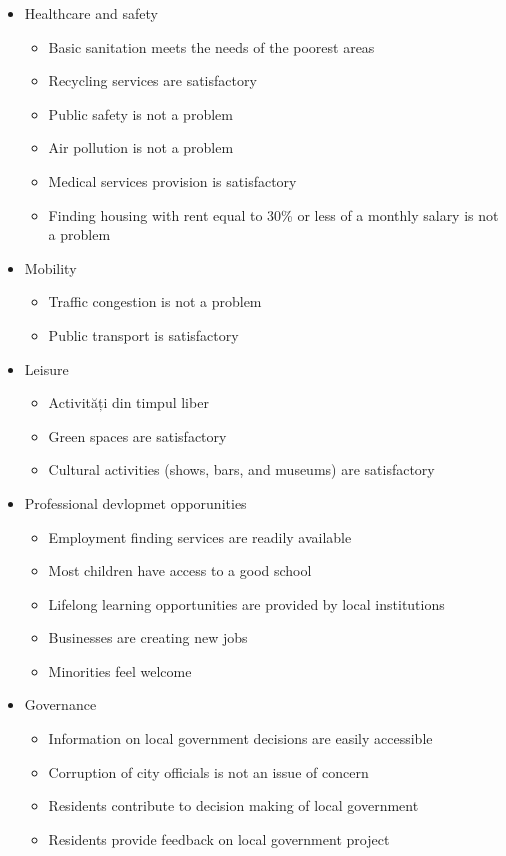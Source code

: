 \documentclass[
  english,
  12pt,
  a4paper,
]{scrartcl}
\providecommand{\tightlist}{%
  \setlength{\itemsep}{0pt}\setlength{\parskip}{0pt}}
\begin{document}
\begin{itemize}
\tightlist
\item
  Healthcare and safety

  \begin{itemize}
  \tightlist
  \item
    Basic sanitation meets the needs of the poorest areas
  \item
    Recycling services are satisfactory
  \item
    Public safety is not a problem
  \item
    Air pollution is not a problem
  \item
    Medical services provision is satisfactory
  \item
    Finding housing with rent equal to 30\% or less of a monthly salary
    is not a problem
  \end{itemize}
\item
  Mobility

  \begin{itemize}
  \tightlist
  \item
    Traffic congestion is not a problem
  \item
    Public transport is satisfactory
  \end{itemize}
\item
  Leisure

  \begin{itemize}
  \tightlist
  \item
    Activități din timpul liber
  \item
    Green spaces are satisfactory
  \item
    Cultural activities (shows, bars, and museums) are satisfactory
  \end{itemize}
\item
  Professional devlopmet opporunities

  \begin{itemize}
  \tightlist
  \item
    Employment finding services are readily available
  \item
    Most children have access to a good school
  \item
    Lifelong learning opportunities are provided by local institutions
  \item
    Businesses are creating new jobs
  \item
    Minorities feel welcome
  \end{itemize}
\item
  Governance

  \begin{itemize}
  \tightlist
  \item
    Information on local government decisions are easily accessible
  \item
    Corruption of city officials is not an issue of concern
  \item
    Residents contribute to decision making of local government
  \item
    Residents provide feedback on local government project
  \end{itemize}
\end{itemize}
\end{document}
